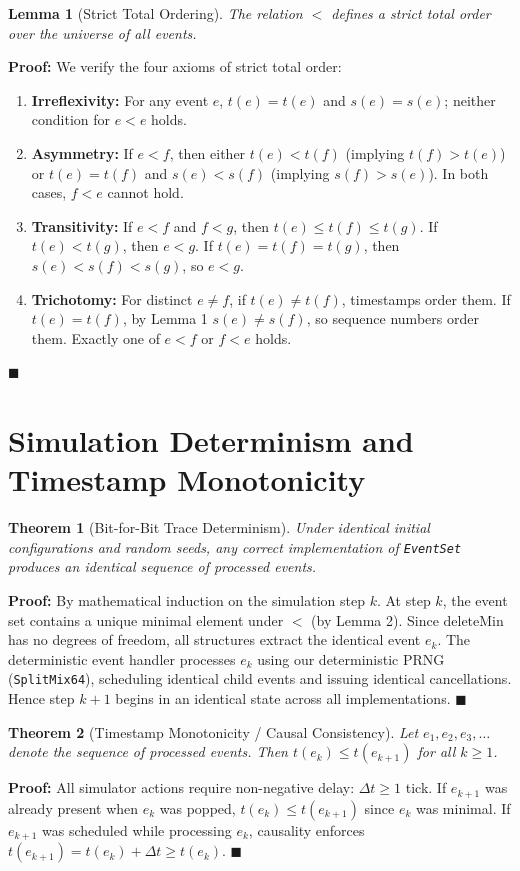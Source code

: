 \documentclass[11pt,a4paper]{article}
\newtheorem{theorem}{Theorem}
\newtheorem{lemma}{Lemma}
\newenvironment{proof}{\noindent\textbf{Proof:}\enspace}{\hfill$\blacksquare$\par\medskip}
\begin{document}
\begin{lemma}[Strict Total Ordering]
The relation $<$ defines a strict total order over the universe of all events.
\end{lemma}
\begin{proof}
We verify the four axioms of strict total order:
\begin{enumerate}
    \item \textbf{Irreflexivity:} For any event $e$, $t(e) = t(e)$ and $s(e) = s(e)$; neither condition for $e < e$ holds.
    \item \textbf{Asymmetry:} If $e < f$, then either $t(e) < t(f)$ (implying $t(f) > t(e)$) or $t(e) = t(f)$ and $s(e) < s(f)$ (implying $s(f) > s(e)$). In both cases, $f < e$ cannot hold.
    \item \textbf{Transitivity:} If $e < f$ and $f < g$, then $t(e) \le t(f) \le t(g)$. If $t(e) < t(g)$, then $e < g$. If $t(e) = t(f) = t(g)$, then $s(e) < s(f) < s(g)$, so $e < g$.
    \item \textbf{Trichotomy:} For distinct $e \ne f$, if $t(e) \ne t(f)$, timestamps order them. If $t(e) = t(f)$, by Lemma 1 $s(e) \ne s(f)$, so sequence numbers order them. Exactly one of $e < f$ or $f < e$ holds.
\end{enumerate}
\end{proof}

\section{Simulation Determinism and Timestamp Monotonicity}

\begin{theorem}[Bit-for-Bit Trace Determinism]
Under identical initial configurations and random seeds, any correct implementation of \texttt{EventSet} produces an identical sequence of processed events.
\end{theorem}
\begin{proof}
By mathematical induction on the simulation step $k$. At step $k$, the event set contains a unique minimal element under $<$ (by Lemma 2). Since $\text{deleteMin}$ has no degrees of freedom, all structures extract the identical event $e_k$. The deterministic event handler processes $e_k$ using our deterministic PRNG (\texttt{SplitMix64}), scheduling identical child events and issuing identical cancellations. Hence step $k+1$ begins in an identical state across all implementations.
\end{proof}

\begin{theorem}[Timestamp Monotonicity / Causal Consistency]
Let $e_1, e_2, e_3, \dots$ denote the sequence of processed events. Then $t(e_k) \le t(e_{k+1})$ for all $k \ge 1$.
\end{theorem}
\begin{proof}
All simulator actions require non-negative delay: $\Delta t \ge 1$ tick. If $e_{k+1}$ was already present when $e_k$ was popped, $t(e_k) \le t(e_{k+1})$ since $e_k$ was minimal. If $e_{k+1}$ was scheduled while processing $e_k$, causality enforces $t(e_{k+1}) = t(e_k) + \Delta t \ge t(e_k)$.
\end{proof}
\end{document}

